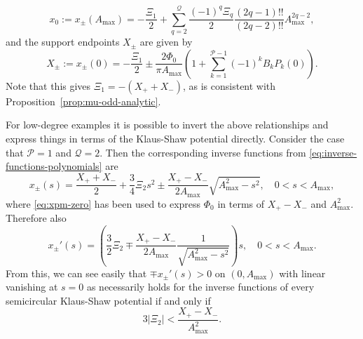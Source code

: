 \documentclass[12pt]{amsart}
\numberwithin{equation}{section}
\newcommand{\phaseint}{\Phi}
\newcommand{\tailint}{\Xi}
\begin{document}
\begin{equation}
x_0:=x_\pm(A_\mathrm{max})=-\frac{\tailint_1}{2} +\sum_{q=2}^{\mathcal{Q}}\frac{(-1)^q\tailint_q}{2}\frac{(2q-1)!!}{(2q-2)!!}A_\mathrm{max}^{2q-2},
\end{equation}
and the support endpoints  $X_\pm$ are given by
\begin{equation}
X_\pm := x_\pm(0)=-\frac{\tailint_1}{2}  \pm \frac{2\phaseint_0}{\pi A_\mathrm{max}}\left(1+\sum_{k=1}^{\mathcal{P}-1}(-1)^kB_kP_{k}(0)\right).
\label{eq:xpm-zero}
\end{equation}
Note that this gives $\tailint_1 = -(X_+ + X_-)$, as is consistent with Proposition~\ref{prop:mu-odd-analytic}. 

For low-degree examples it is possible to invert the above relationships and express things in terms of the Klaus-Shaw potential directly. 
Consider the case that $\mathcal{P}=1$ and $\mathcal{Q}=2$.  
Then the corresponding inverse functions from \eqref{eq:inverse-functions-polynomials} are 
\begin{equation}
x_\pm(s)=\frac{X_++X_-}{2}+\frac{3}{4}\tailint_2s^2 \pm \frac{X_+ - X_-}{2 A_\mathrm{max}} \sqrt{A_\mathrm{max}^2-s^2},\quad 0<s<A_\mathrm{max},
\label{eq:Hirota-inverse-functions}
\end{equation}
where \eqref{eq:xpm-zero} has been used to express $\phaseint_0$ in terms of $X_+ - X_-$ and $A_\mathrm{max}^2$. 
Therefore also
\begin{equation}
x_\pm'(s)=\left(\frac{3}{2}\tailint_2 \mp  \frac{X_+ - X_-}{2 A_\mathrm{max}} \frac{1}{\sqrt{A_\mathrm{max}^2-s^2}}\right)s,\quad 0<s<A_\mathrm{max}.
\end{equation}
From this, we can see easily that $\mp x_\pm'(s)>0$ on $(0,A_\mathrm{max})$ with linear vanishing at $s=0$ as necessarily holds for the inverse functions of every semicircular Klaus-Shaw potential if and only if 
\begin{equation}
3 |\tailint_2|<\frac{X_+-X_-}{A_\mathrm{max}^2}.
\end{equation}
\end{document}
